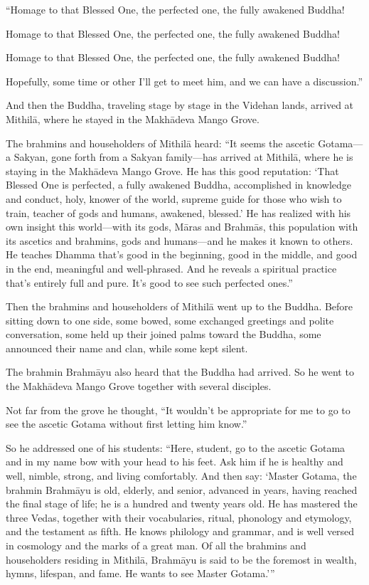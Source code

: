 \documentclass[12pt,openany]{book}%
\begin{document}
“Homage to that Blessed One, the perfected one, the fully awakened Buddha! 

Homage to that Blessed One, the perfected one, the fully awakened Buddha! 

Homage to that Blessed One, the perfected one, the fully awakened Buddha! 

Hopefully, some time or other I’ll get to meet him, and we can have a discussion.” 

And then the Buddha, traveling stage by stage in the Videhan lands, arrived at \textsanskrit{Mithilā}, where he stayed in the \textsanskrit{Makhādeva} Mango Grove. 

The brahmins and householders of \textsanskrit{Mithilā} heard: “It seems the ascetic Gotama—a Sakyan, gone forth from a Sakyan family—has arrived at \textsanskrit{Mithilā}, where he is staying in the \textsanskrit{Makhādeva} Mango Grove. He has this good reputation: ‘That Blessed One is perfected, a fully awakened Buddha, accomplished in knowledge and conduct, holy, knower of the world, supreme guide for those who wish to train, teacher of gods and humans, awakened, blessed.’ He has realized with his own insight this world—with its gods, \textsanskrit{Māras} and \textsanskrit{Brahmās}, this population with its ascetics and brahmins, gods and humans—and he makes it known to others. He teaches Dhamma that’s good in the beginning, good in the middle, and good in the end, meaningful and well-phrased. And he reveals a spiritual practice that’s entirely full and pure. It’s good to see such perfected ones.” 

Then the brahmins and householders of \textsanskrit{Mithilā} went up to the Buddha. Before sitting down to one side, some bowed, some exchanged greetings and polite conversation, some held up their joined palms toward the Buddha, some announced their name and clan, while some kept silent. 

The brahmin \textsanskrit{Brahmāyu} also heard that the Buddha had arrived. So he went to the \textsanskrit{Makhādeva} Mango Grove together with several disciples. 

Not far from the grove he thought, “It wouldn’t be appropriate for me to go to see the ascetic Gotama without first letting him know.” 

So he addressed one of his students: “Here, student, go to the ascetic Gotama and in my name bow with your head to his feet. Ask him if he is healthy and well, nimble, strong, and living comfortably. And then say: ‘Master Gotama, the brahmin \textsanskrit{Brahmāyu} is old, elderly, and senior, advanced in years, having reached the final stage of life; he is a hundred and twenty years old. He has mastered the three Vedas, together with their vocabularies, ritual, phonology and etymology, and the testament as fifth. He knows philology and grammar, and is well versed in cosmology and the marks of a great man. Of all the brahmins and householders residing in \textsanskrit{Mithilā}, \textsanskrit{Brahmāyu} is said to be the foremost in wealth, hymns, lifespan, and fame. He wants to see Master Gotama.’” 
\end{document}
